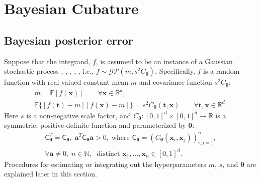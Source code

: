 \documentclass[twocolumn]{svjour3}          %
\newcommand{\bm}[1]{\boldsymbol{#1}}
\newcommand{\reals}{\mathbb{R}}
\newcommand{\Ex}{\mathbb{E}}
\newcommand{\vtheta}{{\bm{\theta}}}
\newcommand{\va}{\bm{a}}
\newcommand{\vt}{\bm{t}}
\newcommand{\vx}{\bm{x}}
\newcommand{\mC}{\mathsf{C}}
\begin{document}
\section{Bayesian Cubature} \label{sec:BC} 


\subsection{Bayesian posterior error}
\label{sec:BayesPostErr}

Suppose that the integrand, $f$, is assumed to be an instance of a Gaussian stochastic process \cite{BriEtal18a}, \cite{Dia88a}, \cite{OHa91a}, \cite{Rit00a}, \cite{RasGha03a}, i.e., $f \sim \mathcal{GP}(m,s^2 C_\vtheta)$.  Specifically, $f$ is a random function with real-valued constant mean $m$ and covariance function $s^2C_\vtheta$:
\begin{gather*}
        m = \Ex[f(\vx)] \qquad \forall \vx \in \reals^d, \\
        \Ex\{[f(\vt) - m][f(\vx) -m]\} = s^2 C_\vtheta(\vt,\vx) \qquad \forall \vt, \vx \in \reals^d.
\end{gather*}
Here $s$ is a non-negative scale factor, and $C_\vtheta: [0,1]^d \times [0,1]^d \to \mathbb{R} $ is a symmetric, positive-definite function and parameterized by $\vtheta$:
\begin{multline} \label{FJH:eq:CondPosDef}
\mC_\vtheta^T = \mC_\vtheta,  \; \va^T \mC_\vtheta \va > 0, \; \text{where }  \mC_\vtheta = \left(  C_\vtheta(\vx_i,\vx_j)  \right)_{i,j=1}^n,\\
 \forall \va \ne 0, \;
 n\in \mathbb{N}, \; \text{ distinct }\vx_1, \ldots, \vx_n \in [0,1]^d.
\end{multline}
Procedures for estimating or integrating out the hyperparameters $m$, $s$, and $\vtheta$ are explained later in this section.
\end{document}
